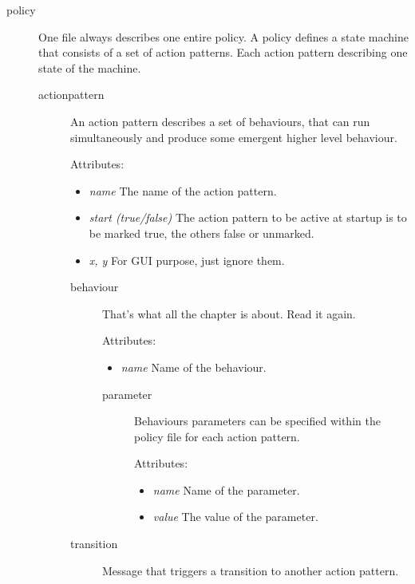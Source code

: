 \begin{description}
  \item[policy]
    One file always describes one entire policy. A policy defines a
    state machine that consists of a set of action patterns. Each
    action pattern describing one state of the machine.
  
  \begin{description}
  \item[actionpattern]
    An action pattern describes a set of behaviours, that can run
    simultaneously and produce some emergent higher level behaviour.
    

    Attributes:
    \begin{itemize}
    \item \textit{name} The name of the action pattern.  
    \item \textit{start (true/false)} The action pattern to be active
      at startup is to be marked true, the others false or unmarked.
    \item \textit{x, y} For GUI purpose, just ignore them.
    \end{itemize}
  
    \begin{description}
    \item[behaviour]
      That's what all the chapter is about. Read it again.

      Attributes: 
      \begin{itemize}
      \item \textit{name} Name of the behaviour.
      \end{itemize}  

      \begin{description}
      \item[parameter]
        Behaviours parameters can be specified within the policy file
        for each action pattern. 

        Attributes: 
        \begin{itemize}
        \item \textit{name} Name of the parameter.  
        \item \textit{value} The value of the parameter.
        \end{itemize}
      
      \end{description}  

    \item[transition]
      Message that triggers a transition to another
      action pattern.  


\end{description}
\end{description}
\end{description}
